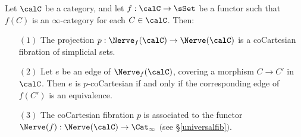 \begin{proposition}\label{sulken}
Let $\calC$ be a category, and let $f: \calC \rightarrow \sSet$ be a functor such that
$f(C)$ is an $\infty$-category for each $C \in \calC$. Then:
\begin{itemize}
\item[$(1)$] The projection $p: \Nerve_{f}(\calC) \rightarrow \Nerve(\calC)$ is a coCartesian fibration of simplicial sets. 

\item[$(2)$] Let $e$ be an edge of $\Nerve_{f}(\calC)$, covering a morphism $C \rightarrow C'$
in $\calC$. Then $e$ is $p$-coCartesian if and only if the corresponding edge of $f(C')$ is an equivalence.

\item[$(3)$] The coCartesian fibration $p$ is associated to the functor $\Nerve(f): \Nerve(\calC) \rightarrow \Cat_{\infty}$ $($see \S \ref{universalfib}$)$. 
\end{itemize}
\end{proposition}

